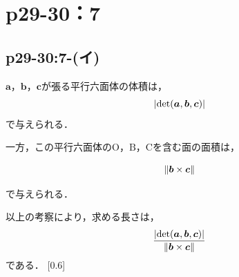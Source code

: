 \documentclass[a4paper,10pt,fleqn]{ltjsarticle}
\begin{document}
\newpage

\section*{p29-30：7}

\subsection*{p29-30:7-(イ)}

\begin{tleftbar}
    $\bm{a}$，$\bm{b}$，$\bm{c}$が張る平行六面体の体積は，
    \[
        \abs{\det (\bm{a},\bm{b},\bm{c})}
    \]
    で与えられる．

    一方，この平行六面体の$\mathrm{O}$，$\mathrm{B}$，$\mathrm{C}$を含む面の面積は，

    \[
        \norm{\bm{b} \times \bm{c}}
    \]

    で与えられる．

    以上の考察により，求める長さは，
    \[
        \frac{\abs{\det(\bm{a},\bm{b},\bm{c})}}{\norm{\bm{b} \times \bm{c}}}
    \]
    である．
    \scalebox{0.6}[0.6]{
        \begin{tikzpicture}[x=0.75pt,y=0.75pt,yscale=-1,xscale=1]


\end{tikzpicture}}
\end{tleftbar}
\end{document}
